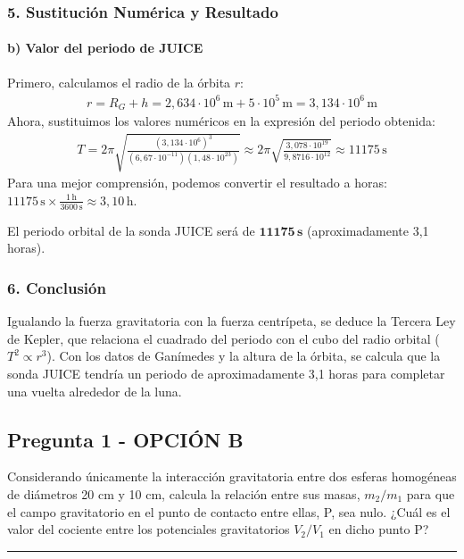 \subsubsection*{5. Sustitución Numérica y Resultado}
\paragraph*{b) Valor del periodo de JUICE}
Primero, calculamos el radio de la órbita $r$:
\begin{gather}
    r = R_G + h = 2,634 \cdot 10^6 \, \text{m} + 5 \cdot 10^5 \, \text{m} = 3,134 \cdot 10^6 \, \text{m}
\end{gather}
Ahora, sustituimos los valores numéricos en la expresión del periodo obtenida:
\begin{gather}
    T = 2\pi \sqrt{\frac{(3,134 \cdot 10^6)^3}{(6,67 \cdot 10^{-11})(1,48 \cdot 10^{23})}} \approx 2\pi \sqrt{\frac{3,078 \cdot 10^{19}}{9,8716 \cdot 10^{12}}} \approx 11175 \, \text{s}
\end{gather}
Para una mejor comprensión, podemos convertir el resultado a horas: $11175 \, \text{s} \times \frac{1 \, \text{h}}{3600 \, \text{s}} \approx 3,10 \, \text{h}$.
\begin{cajaresultado}
    El periodo orbital de la sonda JUICE será de $\boldsymbol{11175 \, \textbf{s}}$ (aproximadamente 3,1 horas).
\end{cajaresultado}

\subsubsection*{6. Conclusión}
\begin{cajaconclusion}
    Igualando la fuerza gravitatoria con la fuerza centrípeta, se deduce la Tercera Ley de Kepler, que relaciona el cuadrado del periodo con el cubo del radio orbital ($T^2 \propto r^3$). Con los datos de Ganímedes y la altura de la órbita, se calcula que la sonda JUICE tendría un periodo de aproximadamente 3,1 horas para completar una vuelta alrededor de la luna.
\end{cajaconclusion}

\newpage

\subsection{Pregunta 1 - OPCIÓN B}
\label{subsec:1B_2025_jul_ext}

\begin{cajaenunciado}
Considerando únicamente la interacción gravitatoria entre dos esferas homogéneas de diámetros 20 cm y 10 cm, calcula la relación entre sus masas, $m_{2}/m_{1}$ para que el campo gravitatorio en el punto de contacto entre ellas, P, sea nulo. ¿Cuál es el valor del cociente entre los potenciales gravitatorios $V_{2}/V_{1}$ en dicho punto P?
\end{cajaenunciado}
\hrule

